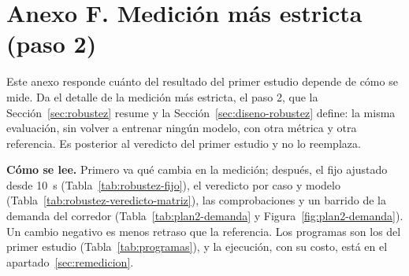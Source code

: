 \section*{Anexo F. Medición más estricta (paso 2)}
{}
\setcounter{table}{0}
\renewcommand{\thetable}{F.\arabic{table}}
\renewcommand{\theHtable}{F.\arabic{table}}
\setcounter{figure}{0}
\renewcommand{\thefigure}{F.\arabic{figure}}
\renewcommand{\theHfigure}{F.\arabic{figure}}
\setcounter{equation}{0}
\renewcommand{\theequation}{F.\arabic{equation}}
\renewcommand{\theHequation}{F.\arabic{equation}}

Este anexo responde cuánto del resultado del primer estudio depende de
cómo se mide. Da el detalle de la medición más estricta, el paso 2, que
la Sección~\ref{sec:robustez} resume y la
Sección~\ref{sec:diseno-robustez} define: la misma evaluación, sin
volver a entrenar ningún modelo, con otra métrica y otra referencia. Es
posterior al veredicto del primer estudio y no lo reemplaza.


\textbf{Cómo se lee.} Primero va qué cambia en la medición; después, el
fijo ajustado desde 10~s (Tabla~\ref{tab:robustez-fijo}), el veredicto
por caso y modelo (Tabla~\ref{tab:robustez-veredicto-matriz}), las
comprobaciones y un barrido de la demanda del corredor
(Tabla~\ref{tab:plan2-demanda} y Figura~\ref{fig:plan2-demanda}). Un
cambio negativo es menos retraso que la referencia. Los programas son
los del primer estudio (Tabla~\ref{tab:programas}), y la ejecución, con
su costo, está en el apartado~\ref{sec:remedicion}.

